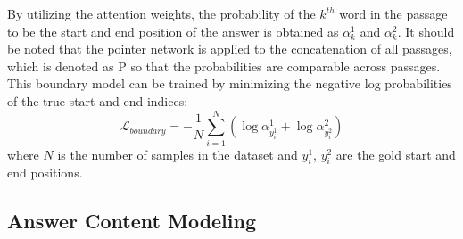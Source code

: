 %

By utilizing the attention weights, the probability of the $k^{th}$ word in the passage to be the start and end position of the answer is obtained as ${\alpha}_k^1$ and ${\alpha}_k^2$. It should be noted that the pointer network is applied to the concatenation of all passages, which is denoted as $\textrm{P}$ so that the probabilities are comparable across passages. This boundary model can be trained by minimizing the negative log probabilities of the true start and end indices:
\begin{equation}
	\mathcal{L}_{boundary} = - \frac{1}{N} \sum_{i=1}^N (\log {\alpha}_{y_i^{1}}^1 + \log {\alpha}_{y_i^{2}}^2)
\end{equation}
\noindent where $N$ is the number of samples in the dataset and $y_i^{1}$, $y_i^{2}$ are the gold start and end positions.


\subsection{Answer Content Modeling}
\label{content}



